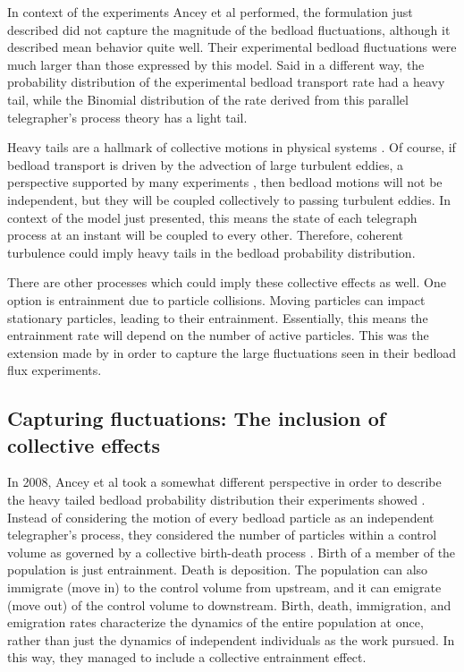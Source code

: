 In context of the experiments Ancey et al performed, the formulation just described did not capture the magnitude of the bedload fluctuations, although it described mean behavior quite well.  
Their experimental bedload fluctuations were much larger than those expressed by this model. 
Said in a different way, the probability distribution of the experimental bedload transport rate had a heavy tail, while the Binomial distribution of the rate derived from this parallel telegrapher's process theory has a light tail. 

Heavy tails are a hallmark of collective motions in physical systems \citep{Sornette2000}. 
Of course, if bedload transport is driven by the advection of large turbulent eddies, a perspective supported by many experiments \citep{Nelson1995, Hofland2006, Celik2014, Amir2014, Shih2017}, then bedload motions will not be independent, but they will be coupled collectively to passing turbulent eddies.
In context of the model just presented, this means the state of each telegraph process at an instant will be coupled to every other. 
Therefore, coherent turbulence could imply heavy tails in the bedload probability distribution. 

There are other processes which could imply these collective effects as well. One option is entrainment due to particle collisions. 
Moving particles can impact stationary particles, leading to their entrainment. 
Essentially, this means the entrainment rate will depend on the number of active particles. 
This was the extension made by \citet{Ancey2008} in order to capture the large fluctuations seen in their bedload flux experiments. 

\subsection{Capturing fluctuations: The inclusion of collective effects} 

In 2008, Ancey et al took a somewhat different perspective in order to describe the heavy tailed bedload probability distribution their experiments showed \citep{Ancey2008}.
Instead of considering the motion of every bedload particle as an independent telegrapher's process, they considered the number of particles within a control volume as governed by a collective birth-death process \citep{Gardiner1983, Gillespie1992, VanKampen1992, Cox1965}.  
Birth of a member of the population is just entrainment. 
Death is deposition. 
The population can also immigrate (move in) to the control volume from upstream, and it can emigrate (move out) of the control volume to downstream. 
Birth, death, immigration, and emigration rates characterize the dynamics of the entire population at once, rather than just the dynamics of independent individuals as the \citet{Ancey2006} work pursued.
In this way, they managed to include a collective entrainment effect. 

